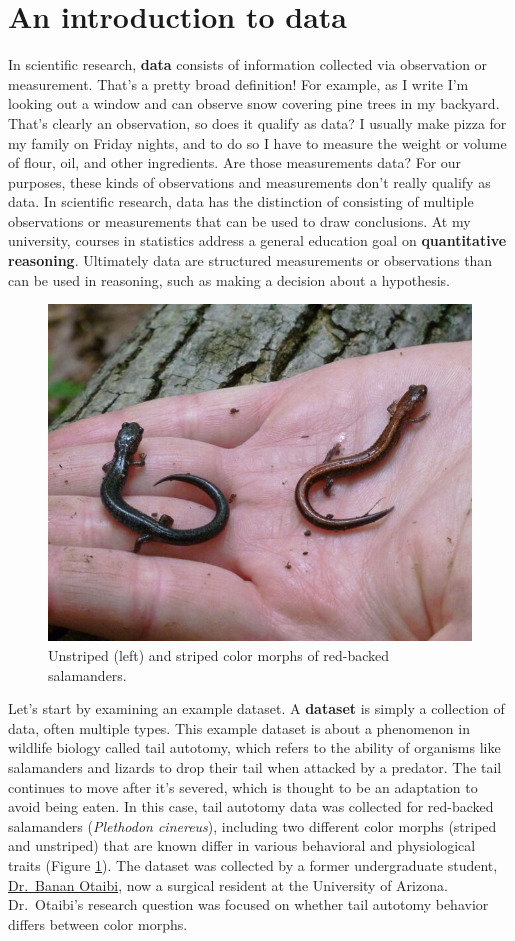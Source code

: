 \documentclass[
]{book}
\begin{document}
\section{An introduction to data}\label{an-introduction-to-data}

In scientific research, \textbf{data} consists of information collected via observation or measurement. That's a pretty broad definition! For example, as I write I'm looking out a window and can observe snow covering pine trees in my backyard. That's clearly an observation, so does it qualify as data? I usually make pizza for my family on Friday nights, and to do so I have to measure the weight or volume of flour, oil, and other ingredients. Are those measurements data? For our purposes, these kinds of observations and measurements don't really qualify as data. In scientific research, data has the distinction of consisting of multiple observations or measurements that can be used to draw conclusions. At my university, courses in statistics address a general education goal on \textbf{quantitative reasoning}. Ultimately data are structured measurements or observations than can be used in reasoning, such as making a decision about a hypothesis.

\begin{figure}

{\centering \includegraphics[width=0.5\linewidth]{images/03_plciMorph} 

}

\caption{Unstriped (left) and striped color morphs of red-backed salamanders.}\label{fig:c3f1}
\end{figure}

Let's start by examining an example dataset. A \textbf{dataset} is simply a collection of data, often multiple types. This example dataset is about a phenomenon in wildlife biology called tail autotomy, which refers to the ability of organisms like salamanders and lizards to drop their tail when attacked by a predator. The tail continues to move after it's severed, which is thought to be an adaptation to avoid being eaten. In this case, tail autotomy data was collected for red-backed salamanders (\emph{Plethodon cinereus}), including two different color morphs (striped and unstriped) that are known differ in various behavioral and physiological traits (Figure \ref{fig:c3f1}). The dataset was collected by a former undergraduate student, \href{https://surgery.arizona.edu/person/banan-wael-otaibi-md}{Dr.~Banan Otaibi}, now a surgical resident at the University of Arizona. Dr.~Otaibi's research question was focused on whether tail autotomy behavior differs between color morphs.
\end{document}
